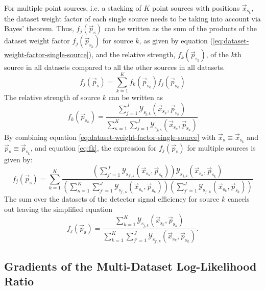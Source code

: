 \documentclass{article}
\newcommand{\ps}{\vec{p}_{\mathrm{s}}}
\newcommand{\psk}{\vec{p}_{\mathrm{s}_k}}
\newcommand{\xs}{\vec{x}_{\mathrm{s}}}
\newcommand{\xsk}{\vec{x}_{\mathrm{s}_k}}
\begin{document}
For multiple point sources, i.e. a stacking of $K$ point sources with positions
$\xsk$, the dataset weight factor of each single source needs
to be taking into account via Bayes' theorem. Thus, $f_{j}(\ps)$ can be written
as the sum of the products of the dataset weight factor $f_{j}(\psk)$ for
source $k$, as given by equation (\ref{eq:dataset-weight-factor-single-source}),
and the relative strength, $f_{k}(\psk)$, of the $k$th source in all datasets
compared to all the other sources in all datasets.
\begin{equation}
 f_{j}(\ps) = \sum_{k=1}^{K} f_{k}(\psk) f_{j}(\psk)
\end{equation}
The relative strength of source $k$ can be written as
\begin{equation}
 f_{k}(\psk) = \frac{\sum_{j=1}^{J} \mathcal{Y}_{\mathrm{s}_{j,k}}(\xsk,\psk)}{\sum_{\kappa=1}^{K} \sum_{j=1}^{J} \mathcal{Y}_{\mathrm{s}_{j,\kappa}}(\vec{x}_{\mathrm{s}_\kappa},\vec{p}_{\mathrm{s}_\kappa}) }
 \label{eq:fk}
\end{equation}
By combining equation \ref{eq:dataset-weight-factor-single-source} with $\xs \equiv \xsk$
and $\ps \equiv \psk$, and equation \ref{eq:fk}, the expression for
$f_{j}(\ps)$ for multiple sources is given by:
\begin{equation}
 f_{j}(\ps) = \sum_{k=1}^{K}
    \frac{\left(\sum_{j'=1}^{J} \mathcal{Y}_{\mathrm{s}_{j',k}}(\xsk,\psk)\right) \mathcal{Y}_{\mathrm{s}_{j,k}}(\xsk,\psk)}
         {\left(\sum_{\kappa=1}^{K} \sum_{j'=1}^{J} \mathcal{Y}_{\mathrm{s}_{j',\kappa}}(\vec{x}_{\mathrm{s}_\kappa},\vec{p}_{\mathrm{s}_\kappa})\right) \left( \sum_{j'=1}^{J} \mathcal{Y}_{\mathrm{s}_{j',k}}(\xsk,\psk) \right)}
\end{equation}
The sum over the datasets of the detector signal efficiency for source $k$ cancels
out leaving the simplified equation
\begin{equation}
 f_{j}(\ps) = \frac{\sum_{k=1}^{K} \mathcal{Y}_{\mathrm{s}_{j,k}}(\xsk,\psk)}
                   {\sum_{k=1}^{K} \sum_{j'=1}^{J} \mathcal{Y}_{\mathrm{s}_{j',k}}(\xsk,\psk)}.
 \label{eq:dataset-weight-factor-multiple-sources}
\end{equation}

\subsection{Gradients of the Multi-Dataset Log-Likelihood Ratio}
\end{document}
